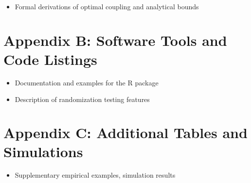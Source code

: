 \documentclass[
  12pt,
]{article}
\providecommand{\tightlist}{%
  \setlength{\itemsep}{0pt}\setlength{\parskip}{0pt}}\usepackage{longtable,booktabs,array}
\theoremstyle{plain}
\theoremstyle{definition}
\theoremstyle{remark}
\begin{document}
\begin{itemize}
\tightlist
\item
  Formal derivations of optimal coupling and analytical bounds
\end{itemize}

\section{Appendix B: Software Tools and Code
Listings}\label{appendix-b-software-tools-and-code-listings}

\begin{itemize}
\tightlist
\item
  Documentation and examples for the R package\\
\item
  Description of randomization testing features
\end{itemize}

\section{Appendix C: Additional Tables and
Simulations}\label{appendix-c-additional-tables-and-simulations}

\begin{itemize}
\tightlist
\item
  Supplementary empirical examples, simulation results
\end{itemize}
\end{document}
